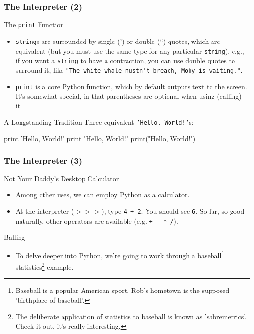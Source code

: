 \documentclass[10pt]{beamer}
\begin{document}
\begin{frame}[fragile]
  \frametitle{The Interpreter (2)}
  \begin{block}{The \texttt{print} Function}
    \begin{itemize}
      \item \texttt{string}s are surrounded by single (') or double (``) quotes, which are equivalent (but you must use the same type for any particular \texttt{string}).
        e.g., if you want a \texttt{string} to have a contraction, you can use double quotes to surround it, like \texttt{"The white whale mustn't breach, Moby is waiting."}.
      \item \texttt{print} is a core Python function, which by default outputs text to the screen. It's somewhat special, in that parentheses are optional when using (calling) it.
    \end{itemize}
  \end{block}
  \begin{block}{A Longstanding Tradition}
    Three equivalent \texttt{'Hello, World!'}s:
    \begin{pythoncode}
  print 'Hello, World!'
  print "Hello, World!"
  print("Hello, World!")
    \end{pythoncode}
  \end{block}
\end{frame}

\begin{frame}
  \frametitle{The Interpreter (3)}
  \begin{block}{Not Your Daddy's Desktop Calculator}
    \begin{itemize}
      \item Among other uses, we can employ Python as a calculator.
      \item At the interpreter (\texttt{$>>>$}), type \texttt{4 + 2}.
        You should see \texttt{6}.
        So far, so good -- naturally, other operators are available (e.g. \texttt{+ - * /}).
    \end{itemize}
  \end{block}
  \begin{block}{Balling}
    \begin{itemize}
      \item To delve deeper into Python, we're going to work through a baseball\footnote{Baseball is a popular American sport. Rob's hometown is the supposed 'birthplace of baseball'.} statistics\footnote{The deliberate application of statistics to baseball is known as 'sabremetrics'. Check it out, it's really interesting.} example.
    \end{itemize}
  \end{block}
\end{frame}
\end{document}
